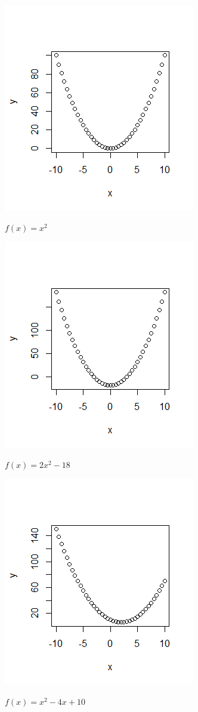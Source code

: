 \documentclass[12pt, a4paper]{article}
\begin{document}
\begin{figure}[H]
	\caption{$f(x) = x^2$}
	\centering
	\includegraphics[scale=1]{images/function1.png}
	\label{fig:function1}
\end{figure}

\begin{figure}[H]
	\caption{$f(x) = 2x^2 - 18$}
	\centering
	\includegraphics[scale=1]{images/function2.png}
	\label{fig:function2}
\end{figure}


\begin{figure}[H]
	\caption{$f(x) = x^2 - 4x + 10$}
	\centering
	\includegraphics[scale=1]{images/function3.png}
	\label{fig:function3}
\end{figure}
\end{document}
